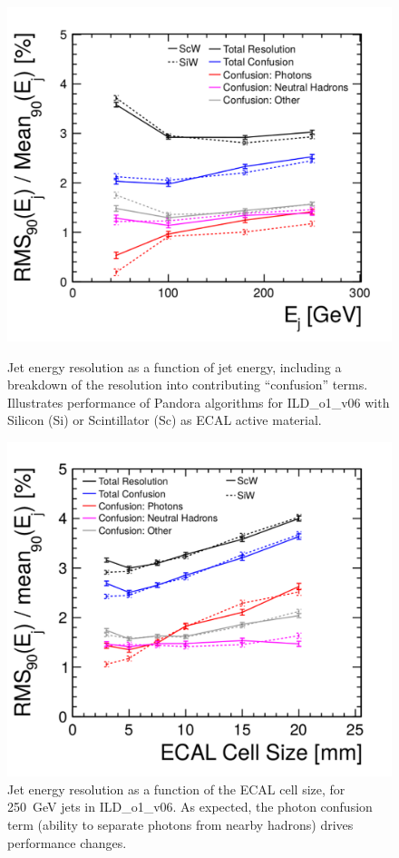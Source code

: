 \begin{figure}
	\begin{minipage}{.49\textwidth}
		\includegraphics[width=\textwidth]{Software/PandoraPFA/JetEnergyResolution}
		\caption{Jet energy resolution as a function of jet energy, including a breakdown of the
		resolution into contributing ``confusion'' terms. Illustrates performance of
		Pandora algorithms for ILD\_o1\_v06 with Silicon (Si) or Scintillator (Sc) as ECAL
		active material.}
		\label{fig:Software:PandoraPFA:JetEnergyResolution}
	\end{minipage}\hfill
	\begin{minipage}{.49\textwidth}
		\includegraphics[width=\textwidth]{Software/PandoraPFA/ECAL_CellSize}
		\caption{Jet energy resolution as a function of the ECAL cell size, for \SI{250}{GeV} jets in
		ILD\_o1\_v06. As expected, the photon confusion term (ability to separate photons
		from nearby hadrons) drives performance changes.}
		\label{fig:Software:PandoraPFA:ECAL_CellSize}
	\end{minipage}
\end{figure}


